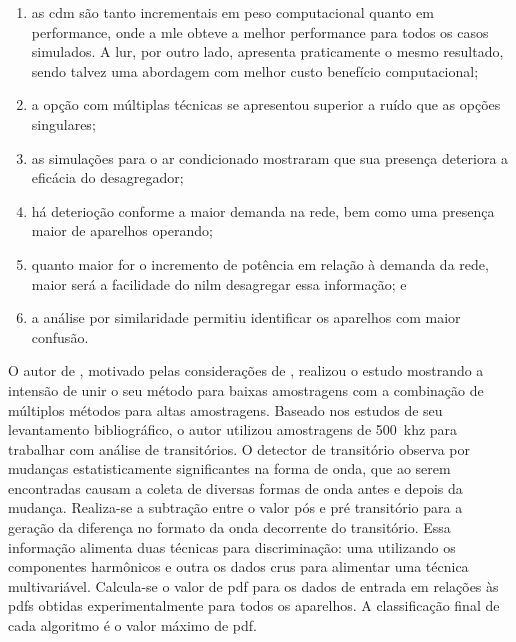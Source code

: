 \begin{enumerate}[label=\textbf{2.\arabic*},wide=\parindent]
\begin{enumerate}[label=\itshape\alph*\upshape)]
\item as \gls{cdm} são tanto incrementais em peso computacional quanto
em performance, onde a \gls{mle} obteve a melhor performance para
todos os casos simulados. A \gls{lur}, por outro lado, apresenta
praticamente o mesmo resultado, sendo talvez uma abordagem com melhor
custo benefício computacional;
\item a opção com múltiplas técnicas se apresentou superior a
ruído que as opções singulares;
\item as simulações para o ar condicionado mostraram que sua presença
deteriora a eficácia do desagregador;
\item há deterioção conforme a maior demanda na rede, bem como uma
presença maior de aparelhos operando;
\item quanto maior for o incremento de potência em relação à demanda
da rede, maior será a facilidade do \gls{nilm} desagregar essa
informação; e
\item a análise por similaridade permitiu identificar os aparelhos com
maior confusão.
\end{enumerate}

O autor de \cite{nilm_zeifman_review_2011}, motivado pelas
considerações de \cite{nilm_liang_pt2_2010_40}, realizou o estudo
\cite{nilm_zeifman_vast_hisample_pdfmerge_2011} mostrando a intensão
de unir o seu método para baixas amostragens 
\cite{nilm_zeifman_vast_2011} com a combinação de múltiplos métodos
para altas amostragens. Baseado nos estudos de seu levantamento
bibliográfico, o autor utilizou amostragens de 500~k\gls{hz} para
trabalhar com análise de transitórios. O detector de transitório
observa por mudanças estatisticamente significantes na forma de onda,
que ao serem encontradas causam a coleta de diversas formas de onda
antes e depois da mudança. Realiza-se a subtração entre o valor pós e
pré transitório para a geração da diferença no formato da onda
decorrente do transitório. Essa informação alimenta duas técnicas para
discriminação: uma utilizando os componentes harmônicos e outra os
dados crus para alimentar uma técnica multivariável. Calcula-se o
valor de \acs{pdf} para os dados de entrada em relações às
\acs{pdf}s obtidas experimentalmente para todos os aparelhos. A
classificação final de cada algoritmo é o valor máximo de
\acs{pdf}.


\end{enumerate}
